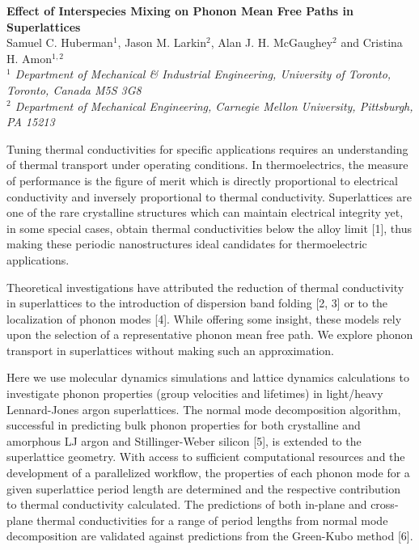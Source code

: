 \documentclass[12pt,twoside]{article}
\begin{document}
\begin{center}
\textbf{Effect of Interspecies Mixing on Phonon Mean Free Paths in Superlattices}\\
\footnotesize
Samuel C. Huberman$^1$, Jason M. Larkin$^2$, Alan J. H. McGaughey$^2$ and Cristina H. Amon$^{1,2}$\\
\textit{$^1$ Department of Mechanical \& Industrial Engineering, University of Toronto, Toronto, Canada M5S 3G8}\\
\textit{$^2$ Department of Mechanical Engineering, Carnegie Mellon University, Pittsburgh, PA 15213}
\end{center}
\begin{spacing}{1.1}

Tuning thermal conductivities for specific applications requires an understanding of thermal transport under operating conditions. In thermoelectrics, the measure of performance is the figure of merit which is directly proportional to electrical conductivity and inversely proportional to thermal conductivity. Superlattices are one of the rare crystalline structures which can maintain electrical integrity yet, in some special cases, obtain thermal conductivities below the alloy limit [1], thus making these periodic nanostructures ideal candidates for thermoelectric applications.

Theoretical investigations have attributed the reduction of thermal conductivity in superlattices to the introduction of dispersion band folding [2, 3] or to the localization of phonon modes [4]. While offering some insight, these models rely upon the selection of a representative phonon mean free path. We explore phonon transport in superlattices without making such an approximation.

Here we use molecular dynamics simulations and lattice dynamics calculations to investigate phonon properties (group velocities and lifetimes) in light/heavy Lennard-Jones argon superlattices. The normal mode decomposition algorithm, successful in predicting bulk phonon properties for both crystalline and amorphous LJ argon and Stillinger-Weber silicon [5], is extended to the superlattice geometry. With access to sufficient computational resources and the development of a parallelized workflow, the properties of each phonon mode for a given superlattice period length are determined and the respective contribution to thermal conductivity calculated. The predictions of both in-plane and cross-plane thermal conductivities for a range of period lengths from normal mode decomposition are validated against predictions from the Green-Kubo method [6].


\end{spacing}
\end{document}
